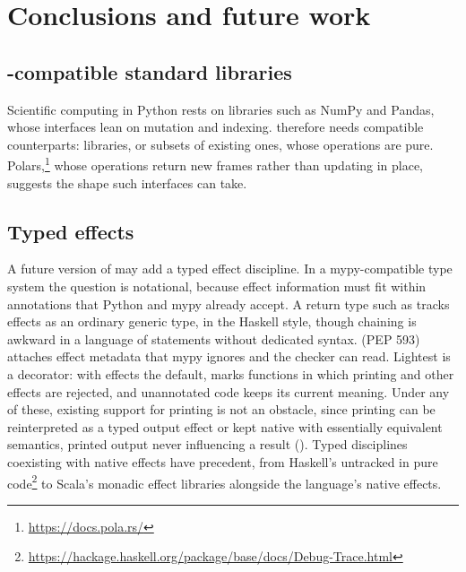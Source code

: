 \section{Conclusions and future work}
\label{sec:conclusion}

\subsection{\PurePy-compatible standard libraries}

Scientific computing in Python rests on libraries such as NumPy and Pandas, whose interfaces lean on
mutation and indexing. \PurePy therefore needs compatible counterparts: libraries, or subsets of existing
ones, whose operations are pure. Polars,\footnote{\url{https://docs.pola.rs/}} whose operations return new frames rather than
updating in place, suggests the shape such interfaces can take.

\subsection{Typed effects}

A future version of \PurePy may add a typed effect discipline. In a mypy-compatible type system the
question is notational, because effect information must fit within annotations that Python and mypy
already accept. A return type such as  tracks effects as an ordinary generic type, in
the Haskell style, though chaining is awkward in a language of statements without dedicated syntax.
 (PEP 593) attaches effect metadata that mypy ignores and the \PurePy
checker can read. Lightest is a decorator: with effects the default,  marks functions in
which printing and other effects are rejected, and unannotated code keeps its current meaning. Under any
of these, existing support for printing is not an obstacle, since printing can be reinterpreted as a typed
output effect or kept native with essentially equivalent semantics, printed output never influencing a
result (). Typed disciplines coexisting with native effects have precedent, from Haskell's
untracked  in pure code\footnote{\url{https://hackage.haskell.org/package/base/docs/Debug-Trace.html}}
to Scala's monadic effect libraries alongside the language's native effects.
